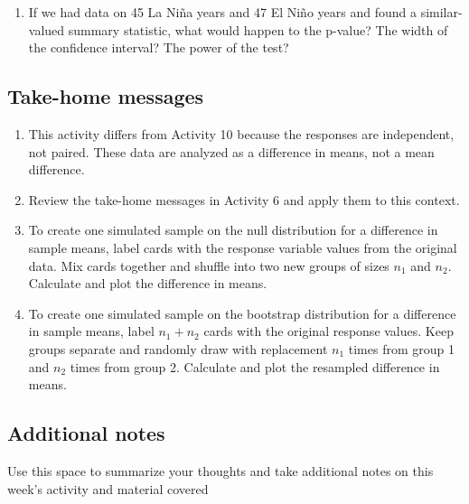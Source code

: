 \documentclass[
]{report}
\providecommand{\tightlist}{%
  \setlength{\itemsep}{0pt}\setlength{\parskip}{0pt}}
\newcommand\latexcode[1]{#1}
\begin{document}
\vspace{1in}

\begin{enumerate}
\def\labelenumi{\arabic{enumi}.}
\setcounter{enumi}{21}
\tightlist
\item
  If we had data on 45 La Ni\latexcode{\~{n}}a years and 47 El Ni\latexcode{\~{n}}o years and found a similar-valued summary statistic, what would happen to the p-value? The width of the confidence interval? The power of the test?
\end{enumerate}

\vspace{1in}

\newpage

\hypertarget{take-home-messages-18}{%
\subsection{Take-home messages}\label{take-home-messages-18}}

\begin{enumerate}
\def\labelenumi{\arabic{enumi}.}
\item
  This activity differs from Activity 10 because the responses are independent, not paired. These data are analyzed as a difference in means, not a mean difference.
\item
  Review the take-home messages in Activity 6 and apply them to this context.
\item
  To create one simulated sample on the null distribution for a difference in sample means, label cards with the response variable values from the original data. Mix cards together and shuffle into two new groups of sizes \(n_1\) and \(n_2\). Calculate and plot the difference in means.
\item
  To create one simulated sample on the bootstrap distribution for a difference in sample means, label \(n_1 + n_2\) cards with the original response values. Keep groups separate and randomly draw with replacement \(n_1\) times from group 1 and \(n_2\) times from group 2. Calculate and plot the resampled difference in means.
\end{enumerate}

\hypertarget{additional-notes-15}{%
\subsection{Additional notes}\label{additional-notes-15}}

Use this space to summarize your thoughts and take additional notes on this week's activity and material covered
\end{document}
